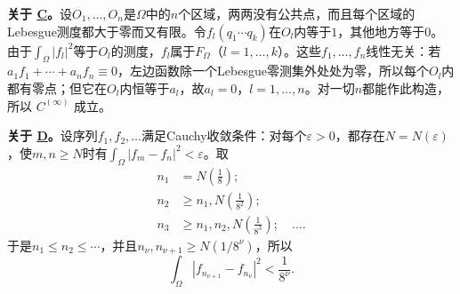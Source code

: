\documentclass[fontsize=13pt,twoside,openany,headings=normal,parskip=false,bookmarkpackage=false,DIV=calc]{scrbook}
\begin{document}
\textbf{关于 \hyperref[ax:II.Cn]{C}。}设$O_1,\allowbreak \ldots,\allowbreak O_n$是$\Omega$中的$n$个区域，两两没有公共点，而且每个区域的Lebesgue测度都大于零而又有限。令$f_l(q_1\cdots q_k)$在$O_l$内等于$1$，其他地方等于$0$。由于$\int_\Omega|f_l|^2$等于$O_l$的测度，$f_l$属于$F_\Omega$（$l=1,\allowbreak \ldots,\allowbreak k$）。这些$f_1,\allowbreak \ldots,\allowbreak f_n$线性无关：若$a_1f_1+\cdots+a_nf_n\equiv0$，左边函数除一个Lebesgue零测集外处处为零，所以每个$O_l$内都有零点；但它在$O_l$内恒等于$a_l$，故$a_l=0$，$l=1,\allowbreak \ldots,\allowbreak n$。对一切$n$都能作此构造，所以 \hyperref[ax:II.Cinfty]{$C^{(\infty)}$} 成立。

\textbf{关于 \hyperref[ax:II.D]{D}。}设序列$f_1,\allowbreak f_2,\allowbreak \ldots$满足Cauchy收敛条件：对每个$\varepsilon>0$，都存在$N=N(\varepsilon)$，使$m,\allowbreak n\geq N$时有$\int_\Omega|f_m-f_n|^2<\varepsilon$。取
\begin{align*}
n_1&=N\left(\frac18\right);\\
n_2&\geq n_1,N\left(\frac1{8^2}\right);\\
n_3&\geq n_1,n_2,N\left(\frac1{8^3}\right);\quad\ldots.
\end{align*}
于是$n_1\leq n_2\leq\cdots$，并且$n_\nu,\allowbreak n_{\nu+1}\geq N(1/8^\nu)$，所以
\[
\int_\Omega|f_{n_{\nu+1}}-f_{n_\nu}|^2<\frac1{8^\nu}.
\]
\end{document}
